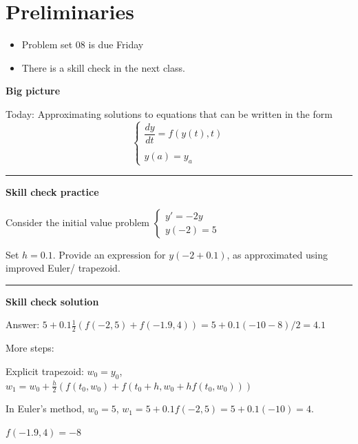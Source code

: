\documentclass[12pt,letterpaper,noanswers]{exam}
\begin{document}
 \pdfpageheight 11in 
  \pdfpagewidth 8.5in

\noindent 

\section*{Preliminaries}

\begin{itemize}
\itemsep0pt
\item Problem set 08 is due Friday
\item There is a skill check in the next class.
\end{itemize}


\noindent\textbf{Big picture}

Today: Approximating solutions to equations that can be written in the form \[\displaystyle\left\{\begin{array}{l}\dfrac{dy}{dt} = f(y(t),t) \\
\\
y(a) = y_a\end{array}\right.\]

\vspace{0.2cm}
\hrule
\vspace{0.2cm}

\noindent \textbf{Skill check practice}

\item Consider the initial value problem $\left\{\begin{array}{l}
y' = -2y \\
y(-2) = 5
\end{array}
\right.$

Set $h = 0.1$.  Provide an expression for $y(-2+0.1)$, as approximated using improved Euler/ trapezoid.




\vspace{0.2cm}
\hrule
\vspace{0.2cm}

\noindent \textbf{Skill check solution}

Answer: $5 + 0.1 \frac{1}{2}(f(-2,5) +f(-1.9,4)) = 5+0.1(-10-8)/2 = 4.1$

More steps:

Explicit trapezoid:
$w_0 = y_0$, $w_1 = w_0 + \frac{h}{2}\left(f(t_0,w_0) + f\left(t_0+h, w_0 + hf(t_0,w_0)\right)\right)$


In Euler's method, $w_0 = 5$, $w_1 = 5 + 0.1f(-2,5) = 5+0.1(-10) = 4$.

$f(-1.9,4) = -8$
\end{document}
